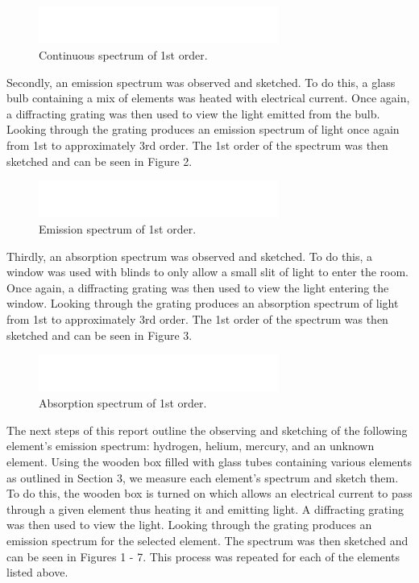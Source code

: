 \documentclass{article}
\begin{document}
\begin{figure}[h]
\centering
\includegraphics[width=0.7\textwidth]{images/BlankSpectrum}
\caption{Continuous spectrum of 1st order.\label{fig:cont}}
\end{figure}

Secondly, an emission spectrum was observed and sketched. To do this, a glass bulb 
containing a mix of elements was heated with electrical current. Once again, a 
diffracting grating was then used to view the light emitted from the bulb. Looking
through the grating produces an emission spectrum of light once again from 1st to
approximately 3rd order. The 1st order of the spectrum was then sketched and can be seen 
in Figure 2.\\

\begin{figure}[h]
\centering
\includegraphics[width=0.7\textwidth]{images/BlankSpectrum}
\caption{Emission spectrum of 1st order.\label{fig:cont}}
\end{figure}

Thirdly, an absorption spectrum was observed and sketched. To do this, a window was
used with blinds to only allow a small slit of light to enter the room. Once again,
a diffracting grating was then used to view the light entering the window. Looking
through the grating produces an absorption spectrum of light from 1st to approximately
3rd order. The 1st order of the spectrum was then sketched and can be seen in Figure 3.\\

\begin{figure}[h]
\centering
\includegraphics[width=0.7\textwidth]{images/BlankSpectrum}
\caption{Absorption spectrum of 1st order.\label{fig:cont}}
\end{figure}

The next steps of this report outline the observing and sketching of the following
element's emission spectrum: hydrogen, helium, mercury, and an unknown element. 
Using the wooden box filled with glass tubes containing various elements as outlined
in Section 3, we measure each element's spectrum and sketch them. To do this, the wooden
box is turned on which allows an electrical current to pass through a given element thus
heating it and emitting light. A diffracting grating was then used to view the light. 
Looking through the grating produces an emission spectrum for the selected 
element. The spectrum was then sketched and can be seen in Figures 1 - 7. This process 
was repeated for each of the elements listed above.\\
\end{document}
